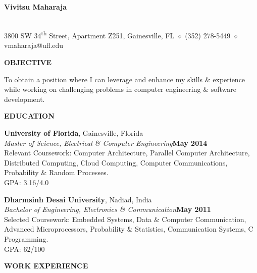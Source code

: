 \documentclass[10pt]{article}
\begin{document}
\begin{center}
{\Large \bf Vivitsu Maharaja}
\date{}
\thispagestyle{empty}
\smallskip \\
{\small 3800 SW 34\textsuperscript{th} Street, Apartment Z251, Gainesville, FL $\diamond$ (352) 278-5449 $\diamond$ vmaharaja@ufl.edu}
\end{center}

\MakeUppercase{\bf Objective}

To obtain a position where I can leverage and enhance my skills \& experience while working on challenging problems in computer engineering \& software development.

\MakeUppercase{\bf Education}

{\bf University of Florida}, Gainesville, Florida\\
\textit{Master of Science, Electrical \& Computer Engineering}\hfill{\bf May 2014}\\
Relevant Coursework: Computer Architecture, Parallel Computer Architecture, Distributed Computing, Cloud Computing, Computer Communications, Probability \& Random Processes.\\
GPA: 3.16/4.0 %

{\bf Dharmsinh Desai University}, Nadiad, India\\
\textit{Bachelor of Engineering, Electronics \& Communication}\hfill{\bf May 2011}\\
Selected Coursework: Embedded Systems, Data \& Computer Communication, Advanced Microprocessors, Probability \& Statistics, Communication Systems, C Programming.\\
GPA: 62/100

\MakeUppercase{\bf Work Experience}
\end{document}
